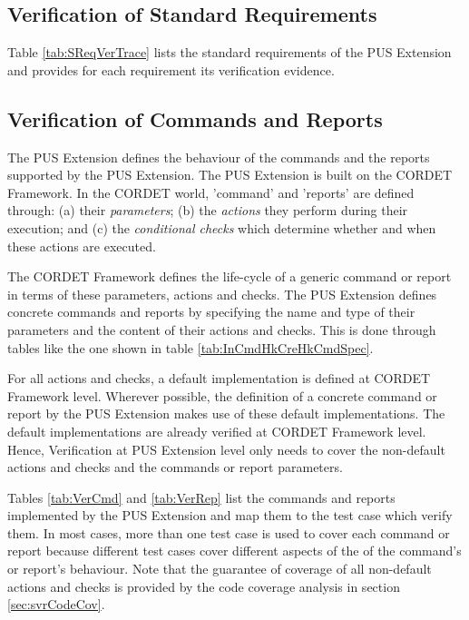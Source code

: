 \documentclass{pnp_article}
\begin{document}
\subsection{Verification of Standard Requirements}\label{sec:svrVerStdReq}
Table \ref{tab:SReqVerTrace} lists the standard requirements of the PUS Extension and provides for each requirement its verification evidence.


\subsection{Verification of Commands and Reports}\label{sec:svrVerCmdReps}
The PUS Extension defines the behaviour of the commands and the reports supported by the PUS Extension. The PUS Extension is built on the CORDET Framework. In the CORDET world, 'command' and 'reports' are defined through: (a) their \textit{parameters}; (b) the \textit{actions} they perform during their execution; and (c) the \textit{conditional checks} which determine whether and when these actions are executed. 

The CORDET Framework defines the life-cycle of a generic command or report in terms of these parameters, actions and checks. The PUS Extension defines concrete commands and reports by specifying the name and type of their parameters and the content of their actions and checks. This is done through tables like the one shown in table \ref{tab:InCmdHkCreHkCmdSpec}. 

\newpage
{}

For all actions and checks, a default implementation is defined at CORDET Framework level. Wherever possible, the definition of a concrete command or report by the PUS Extension makes use of these default implementations. The default implementations are already verified at CORDET Framework level. Hence, Verification at PUS Extension level only needs to cover the non-default actions and checks and the commands or report parameters.

Tables \ref{tab:VerCmd} and \ref{tab:VerRep} list the commands and reports implemented by the PUS Extension and map them to the test case which verify them. In most cases, more than one test case is used to cover each command or report because different test cases cover different aspects of the of the command's or report's behaviour. Note that the guarantee of coverage of all non-default actions and checks is provided by the code coverage analysis in section \ref{sec:svrCodeCov}.
\end{document}
